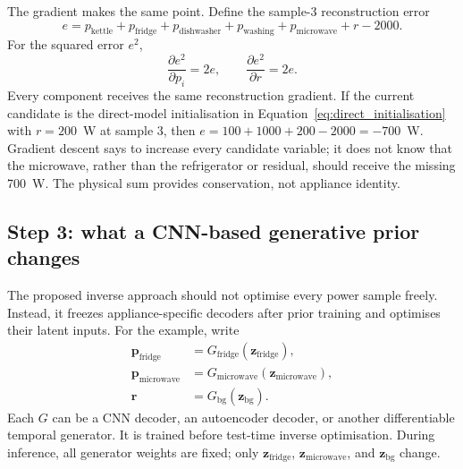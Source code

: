 \documentclass[11pt]{article}
\newcommand{\vect}[1]{\mathbf{#1}}
\begin{document}
The gradient makes the same point. Define the sample-3 reconstruction error
\begin{equation}
    e= p_{\mathrm{kettle}}+p_{\mathrm{fridge}}+
    p_{\mathrm{dishwasher}}+p_{\mathrm{washing}}+
    p_{\mathrm{microwave}}+r-2000.
\end{equation}
For the squared error $e^2$,
\begin{equation}
    \frac{\partial e^2}{\partial p_i}=2e,
    \qquad
    \frac{\partial e^2}{\partial r}=2e.
    \label{eq:example_equal_gradients}
\end{equation}
Every component receives the same reconstruction gradient. If the current candidate is the direct-model initialisation in Equation~\eqref{eq:direct_initialisation} with $r=200$~W at sample 3, then $e=100+1000+200-2000=-700$~W. Gradient descent says to increase every candidate variable; it does not know that the microwave, rather than the refrigerator or residual, should receive the missing 700~W. The physical sum provides conservation, not appliance identity.

\subsection{Step 3: what a CNN-based generative prior changes}

The proposed inverse approach should not optimise every power sample freely. Instead, it freezes appliance-specific decoders after prior training and optimises their latent inputs. For the example, write
\begin{align}
    \vect{p}_{\mathrm{fridge}}&=G_{\mathrm{fridge}}(\vect{z}_{\mathrm{fridge}}),\\
    \vect{p}_{\mathrm{microwave}}&=G_{\mathrm{microwave}}(\vect{z}_{\mathrm{microwave}}),\\
    \vect{r}&=G_{\mathrm{bg}}(\vect{z}_{\mathrm{bg}}).
    \label{eq:example_generators}
\end{align}
Each $G$ can be a CNN decoder, an autoencoder decoder, or another differentiable temporal generator. It is trained before test-time inverse optimisation. During inference, all generator weights are fixed; only $\vect{z}_{\mathrm{fridge}}$, $\vect{z}_{\mathrm{microwave}}$, and $\vect{z}_{\mathrm{bg}}$ change.
\end{document}
